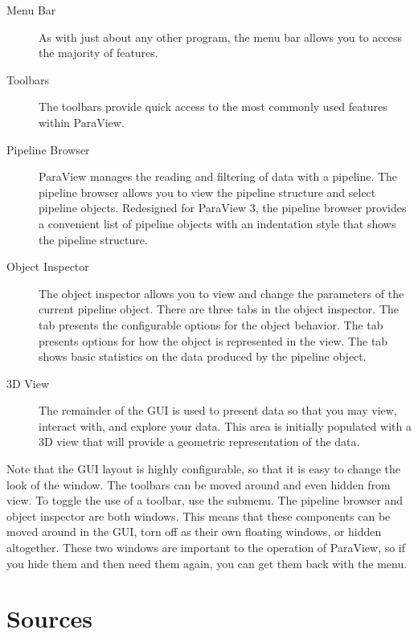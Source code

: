\begin{description}
\item[Menu Bar]  As with just about any other program, the
  menu bar allows you to access the majority of features.
\item[Toolbars]  The toolbars provide quick access to the
  most commonly used features within ParaView.
\item[Pipeline Browser]  ParaView manages the
  reading and filtering of data with a pipeline.  The pipeline browser
  allows you to view the pipeline structure and select pipeline objects.
  Redesigned for ParaView 3, the pipeline browser provides a convenient
  list of pipeline objects with an indentation style that shows the
  pipeline structure.
\item[Object Inspector]  The object inspector
  allows you to view and change the parameters of the current pipeline
  object.  There are three tabs in the object inspector.  The
   tab presents the configurable options for the object
  behavior.  The  tab presents options for how the object
  is represented in the view.  The  tab shows basic
  statistics on the data produced by the pipeline object.
\item[3D View]  The remainder of the GUI is used to present
  data so that you may view, interact with, and explore your data.  This
  area is initially populated with a 3D view that will provide a geometric
  representation of the data.
\end{description}

Note that the GUI layout is highly configurable, so that it is easy to
change the look of the window.  The toolbars can be moved around and even
hidden from view.  To toggle the use of a toolbar, use the  \ra
{} submenu.  The pipeline browser and object inspector are both
 windows.  This means that these components can be moved
around in the GUI, torn off as their own floating windows, or hidden
altogether.  These two windows are important to the operation of ParaView,
so if you hide them and then need them again, you can get them back with
the  menu.


\section{Sources}


